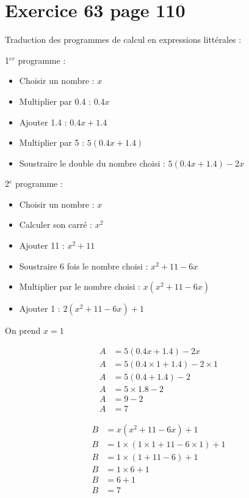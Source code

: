 \documentclass[12pt,a4paper]{article}
\begin{document}
\section*{Exercice 63 page 110}

Traduction des programmes de calcul en expressions littérales :

1$^{er}$ programme :
\begin{itemize}
	\item Choisir un nombre : $x$
	\item Multiplier par \num{0.4} : $\num{0.4}x$
	\item Ajouter \num{1.4} : $\num{0.4}x + \num{1.4}$
	\item Multiplier par 5 : $5(\num{0.4}x + \num{1.4})$
	\item Soustraire le double du nombre choisi : $5(\num{0.4}x + \num{1.4}) - 2x$
\end{itemize}


2$^{e}$ programme :
\begin{itemize}
	\item Choisir un nombre : $x$
	\item Calculer son carré : $x^2$
	\item Ajouter \num{11} : $x^2 + 11$
	\item Soustraire 6 fois le nombre choisi : $x^2 + 11 - 6x$
	\item Multiplier par le nombre choisi : $x(x^2 + 11 - 6x)$
	\item Ajouter 1 : $2(x^2 + 11 - 6x) + 1$
\end{itemize}



\vspace*{1cm}


On prend $x=1$


\begin{multicols}{2}
	\begin{align*}
	A &= 5(\num{0.4}x + \num{1.4}) - 2x\\
	A &= 5(\num{0.4}\times 1 + \num{1.4}) - 2 \times 1\\
	A &= 5(\num{0.4} + \num{1.4}) - 2 \\
	A &= 5 \times \num{1.8} - 2 \\
	A &= 9 - 2 \\
	A &= 7 
	\end{align*}
	
	\begin{align*}
	B &= x(x^2 + 11 - 6x) + 1\\
	B &= 1 \times (1 \times 1 + 11 - 6 \times 1) + 1 \\
	B &= 1 \times (1 + 11 - 6) + 1 \\
	B &= 1 \times 6 + 1 \\
	B &= 6 +1 \\
	B &= 7 
	\end{align*}	
\end{multicols}
\end{document}
